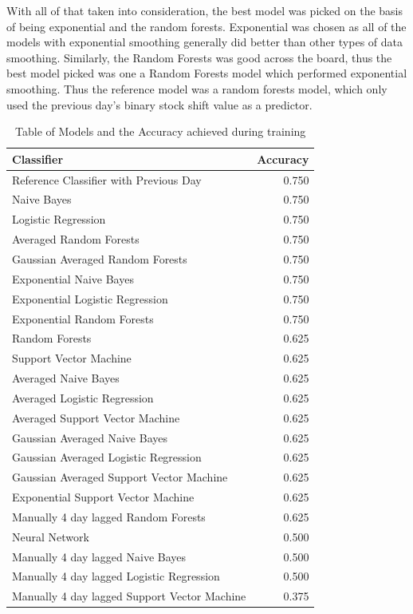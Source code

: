 With all of that taken into consideration, the best model was picked on the basis of being exponential and the random forests. Exponential was chosen as all of the models with exponential smoothing generally did better than other types of data smoothing. Similarly, the Random Forests was good across the board, thus the best model picked was one a Random Forests model which performed exponential smoothing. Thus the reference model was a random forests model, which only used the previous day's binary stock shift value as a predictor. 
\begin{table}[H]
	\centering 
\begin{tabular}{lr}

	Classifier &  Accuracy \\
	\hline
	Reference Classifier with Previous Day & 0.750\\
	\hline
                                  Naive Bayes &     0.750 \\
Logistic Regression &     0.750 \\
Averaged Random Forests &     0.750 \\
Gaussian Averaged Random Forests &     0.750 \\
Exponential Naive Bayes &     0.750 \\
Exponential Logistic Regression &     0.750 \\
Exponential Random Forests &     0.750 \\
Random Forests &     0.625 \\
Support Vector Machine &     0.625 \\
Averaged Naive Bayes &     0.625 \\
Averaged Logistic Regression &     0.625 \\
Averaged Support Vector Machine &     0.625 \\
Gaussian Averaged Naive Bayes &     0.625 \\
Gaussian Averaged Logistic Regression &     0.625 \\
Gaussian Averaged Support Vector Machine &     0.625 \\
Exponential Support Vector Machine &     0.625 \\
Manually 4 day lagged Random Forests &     0.625 \\
Neural Network & 0.500 \\
Manually 4 day lagged Naive Bayes &     0.500 \\
Manually 4 day lagged Logistic Regression &     0.500 \\
Manually 4 day lagged Support Vector Machine &     0.375 \\
	

\end{tabular}

	\caption{Table of Models and the Accuracy achieved during training}
		\label{table:modaccuracy}
\end{table}
